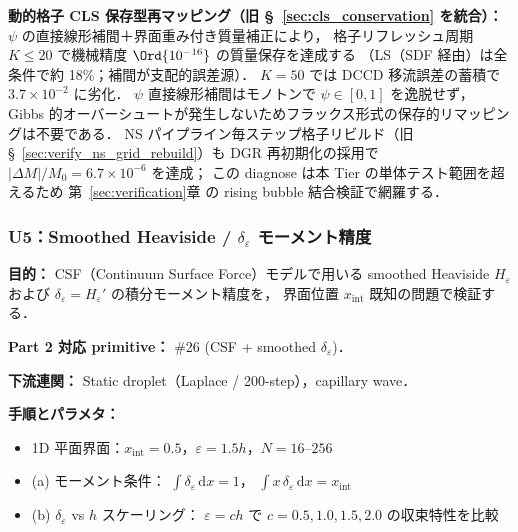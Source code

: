 \medskip
\noindent\textbf{動的格子 CLS 保存型再マッピング（旧 §~\ref{sec:cls_conservation} を統合）：}\\
\noindent\label{sec:cls_conservation}%
\noindent\label{app:cls_conservation}%
$\psi$ の直接線形補間＋界面重み付き質量補正により，
格子リフレッシュ周期 $K \leq 20$ で機械精度 $\Ord{10^{-16}}$ の質量保存を達成する
（LS（SDF 経由）は全条件で約 18\%；補間が支配的誤差源）．
$K = 50$ では DCCD 移流誤差の蓄積で $3.7 \times 10^{-2}$ に劣化．
$\psi$ 直接線形補間はモノトンで $\psi \in [0, 1]$ を逸脱せず，
Gibbs 的オーバーシュートが発生しないためフラックス形式の保存的リマッピングは不要である．
NS パイプライン毎ステップ格子リビルド（旧 §~\ref{sec:verify_ns_grid_rebuild}）も
DGR 再初期化の採用で $|\Delta M|/M_0 = 6.7 \times 10^{-6}$ を達成；
この diagnose は本 Tier の単体テスト範囲を超えるため
第~\ref{sec:verification}章 の rising bubble 結合検証で網羅する．
\label{sec:verify_ns_grid_rebuild}%

\subsubsection{U5：Smoothed Heaviside / $\delta_\varepsilon$ モーメント精度}
\label{sec:U5_smoothed_heaviside_delta}

\noindent\textbf{目的：}
CSF（Continuum Surface Force）モデルで用いる
smoothed Heaviside $H_\varepsilon$ および
$\delta_\varepsilon = H_\varepsilon'$ の積分モーメント精度を，
界面位置 $x_\mathrm{int}$ 既知の問題で検証する．

\noindent\textbf{Part 2 対応 primitive：} \#26 (CSF + smoothed $\delta_\varepsilon$)．

\noindent\textbf{下流連関：}
Static droplet（Laplace / 200-step），capillary wave．

\noindent\textbf{手順とパラメタ：}
\begin{itemize}[noitemsep]
  \item 1D 平面界面：$x_\mathrm{int} = 0.5$，$\varepsilon = 1.5h$，$N = 16$--$256$
  \item (a) モーメント条件：
        $\int \delta_\varepsilon\,\mathrm{d}x = 1$，
        $\int x\,\delta_\varepsilon\,\mathrm{d}x = x_\mathrm{int}$
  \item (b) $\delta_\varepsilon$ vs $h$ スケーリング：
        $\varepsilon = c h$ で $c = 0.5, 1.0, 1.5, 2.0$ の収束特性を比較
\end{itemize}

